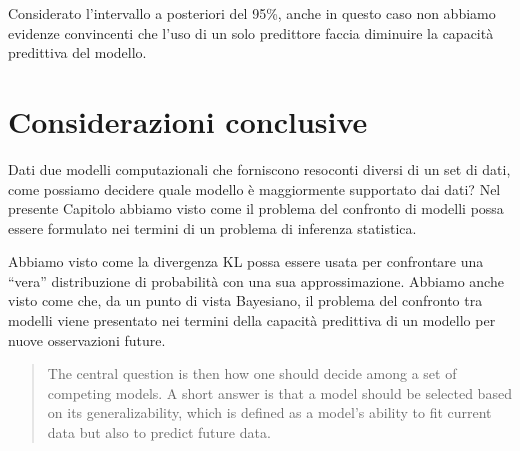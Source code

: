 \documentclass[
  10pt,
  italian,
  a4paper,
  extrafontsizes,onecolumn,openright
  ]{memoir}
\theoremstyle{definition}
\theoremstyle{definition}
\theoremstyle{definition}
\theoremstyle{definition}
\theoremstyle{remark}
\begin{document}
\noindent
Considerato l'intervallo a posteriori del 95\%, anche in questo caso non abbiamo evidenze convincenti che l'uso di un solo predittore faccia diminuire la capacità predittiva del modello.

\hypertarget{considerazioni-conclusive}{%
\section*{Considerazioni conclusive}\label{considerazioni-conclusive}}

Dati due modelli computazionali che forniscono resoconti diversi di un set di dati, come possiamo decidere quale modello è maggiormente supportato dai dati? Nel presente Capitolo abbiamo visto come il problema del confronto di modelli possa essere formulato nei termini di un problema di inferenza statistica.

Abbiamo visto come la divergenza KL possa essere usata per confrontare una ``vera'' distribuzione di probabilità con una sua approssimazione. Abbiamo anche visto come che, da un punto di vista Bayesiano, il problema del confronto tra modelli viene presentato nei termini della capacità predittiva di un modello per nuove osservazioni future.

\begin{quote}
The central question is then how one should decide among a set of competing models. A short answer is that a model should be selected based on its generalizability, which is defined as a model's ability to fit current data but also to predict future data. \autocite{myung2003tutorial}
\end{quote}
\end{document}
